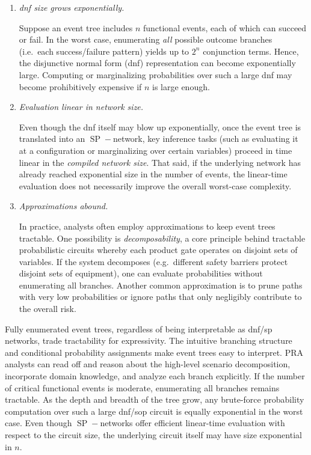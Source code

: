 \begin{enumerate}
    \item \emph{\acrshort{dnf} size grows exponentially.}
    
    Suppose an event tree includes \(n\) functional events, each of which can succeed or fail.  In the worst case, enumerating \emph{all} possible outcome branches (i.e.\ each success/failure pattern) yields up to \(2^n\) conjunction terms.  Hence, the disjunctive normal form (\acrshort{dnf}) representation can become exponentially large.  Computing or marginalizing probabilities over such a large \acrshort{dnf} may become prohibitively expensive if \(n\) is large enough.

    \item \emph{Evaluation linear in network size.}
    
    Even though the \acrshort{dnf} itself may blow up exponentially, once the event tree is translated into an \(\operatorname{SP}\!-\)network, key inference tasks (such as evaluating it at a configuration or marginalizing over certain variables) proceed in time linear in the \emph{compiled network size}.  That said, if the underlying network has already reached exponential size in the number of events, the linear-time evaluation does not necessarily improve the overall worst-case complexity.
    
    \item \emph{Approximations abound.}
    
    In practice, analysts often employ approximations to keep event trees tractable.  One possibility is \emph{decomposability}, a core principle behind tractable probabilistic circuits whereby each product gate operates on disjoint sets of variables.  If the system decomposes (e.g.\ different safety barriers protect disjoint sets of equipment), one can evaluate probabilities without enumerating all branches.  Another common approximation is to prune paths with very low probabilities or ignore paths that only negligibly contribute to the overall risk.
\end{enumerate}

Fully enumerated event trees, regardless of being interpretable as \acrshort{dnf}/\acrshort{sp} networks, trade tractability for expressivity. The intuitive branching structure and conditional probability assignments make event trees easy to interpret. PRA analysts can read off and reason about the high-level scenario decomposition, incorporate domain knowledge, and analyze each branch explicitly.  If the number of critical functional events is moderate, enumerating all branches remains tractable. As the depth and breadth of the tree grow, any brute-force probability computation over such a large \acrshort{dnf}/\acrshort{sop} circuit is equally exponential in the worst case. Even though \(\operatorname{SP}\!-\)networks offer efficient linear-time evaluation with respect to the circuit size, the underlying circuit itself may have size exponential in \(n\).